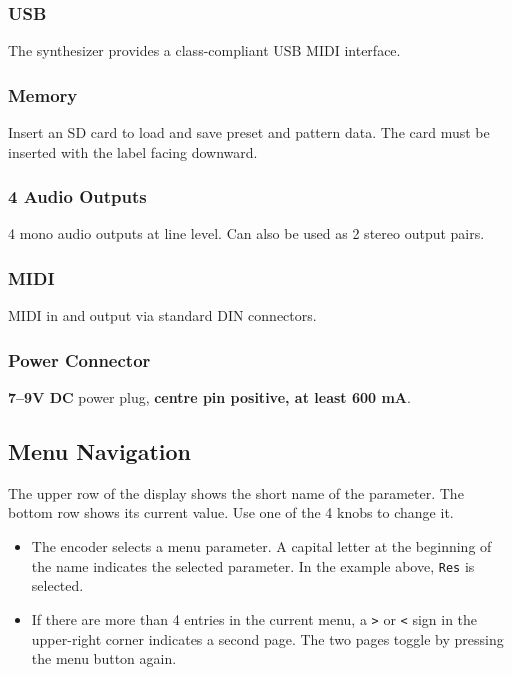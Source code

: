 \subsubsection{USB}\label{usb}

The synthesizer provides a class-compliant USB MIDI interface.

\subsubsection{Memory}\label{memory}

Insert an SD card to load and save preset and pattern data. The card
must be inserted with the label facing downward.


\subsubsection{4 Audio Outputs}\label{audio-outputs}

4 mono audio outputs at line level. Can also be used as 2 stereo output
pairs.

\subsubsection{MIDI}\label{midi}

MIDI in and output via standard DIN connectors.

\subsubsection{Power Connector}\label{power-connector}

\textbf{7--9V DC} power plug, \textbf{centre pin positive, at least 600
mA}.

\subsection{Menu Navigation}\label{menu-navigation}

The upper row of the display shows the short name of the parameter. The
bottom row shows its current value. Use one of the 4 knobs to change it.


\begin{itemize}
\tightlist
\item
  The encoder selects a menu parameter. A capital letter at the
  beginning of the name indicates the selected parameter. In the example
  above, \texttt{Res} is selected.
\item
  If there are more than 4 entries in the current menu, a
  \texttt{\textgreater{}} or \texttt{\textless{}} sign in the
  upper-right corner indicates a second page. The two pages toggle by
  pressing the menu button again.
\end{itemize}

